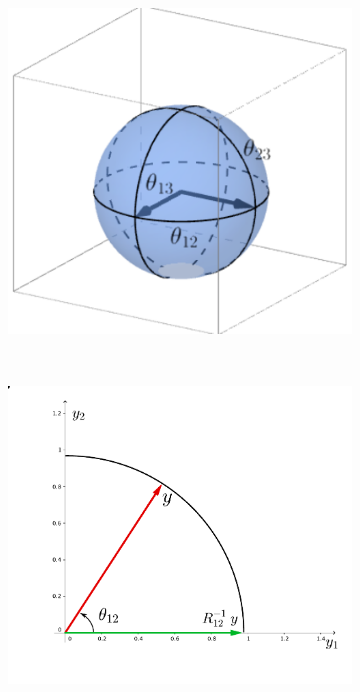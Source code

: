 \documentclass{article}
\begin{document}
\begin{figure}
    \centering
    \begin{subfigure}[b]{0.3\textwidth}
        \includegraphics[width=\textwidth]{StiefelGeom.pdf}
        \caption{}
        \label{fig:StiefelGeom}
    \end{subfigure}
    ~ %
    \begin{subfigure}[b]{0.3\textwidth}
        \includegraphics[width=\textwidth]{GivensReduction.pdf}

\end{subfigure}
\end{figure}
\end{document}
